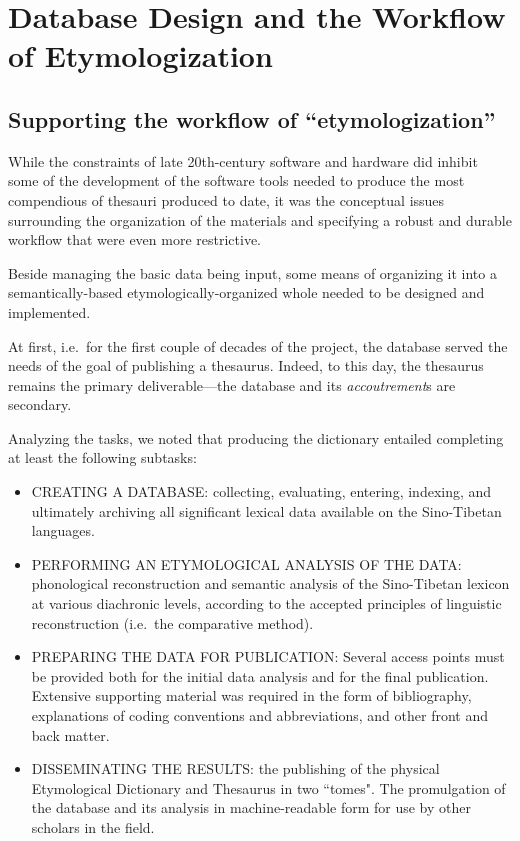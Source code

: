 \section{Database Design and the Workflow of Etymologization}

\subsection{Supporting the workflow of ``etymologization''}
While the constraints of late 20th-century software and hardware did inhibit some of
the development of the software tools needed to produce the most
compendious of thesauri produced to date, it was the conceptual issues
surrounding the organization of the materials and specifying a robust
and durable workflow that were even more restrictive.  

Beside managing the basic data being input, some means of organizing
it into a semantically-based etymologically-organized whole needed to
be designed and implemented. 

At first, i.e.\ for the first couple of decades of the project, the
database served the needs of the goal of publishing a
thesaurus. Indeed, to this day, the thesaurus remains the primary
deliverable---the database and its {\it accoutrement}s are secondary.

Analyzing the tasks, we noted that producing the dictionary entailed completing at least the following
subtasks:
\begin{itemize}
\item  CREATING A DATABASE:  collecting, evaluating, entering, indexing, and ultimately archiving all significant lexical data available on the Sino-Tibetan languages.
\item  PERFORMING AN ETYMOLOGICAL ANALYSIS OF THE DATA: phonological reconstruction and semantic analysis of the Sino-Tibetan lexicon at various diachronic levels, according to the accepted principles of linguistic reconstruction (i.e.\ the comparative method).
\item  PREPARING THE DATA FOR PUBLICATION: Several access points must be provided both for the initial data analysis and for the final publication.  Extensive supporting material was required in the form of bibliography, explanations of coding conventions and abbreviations, and other front and back matter.
\item  DISSEMINATING THE RESULTS: the publishing of the physical Etymological Dictionary and
  Thesaurus in two ``tomes".  The promulgation of the database and its
  analysis in machine-readable form for use by other
  scholars in the field.
\end{itemize}


